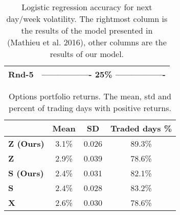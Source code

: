 \documentclass[10pt,twocolumn,letterpaper]{article}
\begin{document}
\begin{table}[t]
\begin{small}
\begin{tabular}{l@{~}l@{~}l@{~}l@{~}l@{~}l}
\textbf{Rnd-5}  & \multicolumn{5}{c}{---------------- 25\% ----------------}                                                                                                                                                             \\ \bottomrule
\end{tabular}
\end{small}
 \smallskip
\caption{Logistic regression accuracy for next day/week  volatility. The rightmost column is the results of the model presented in (Mathieu et al. 2016), other columns are the results of our model.}
\label{vol_exc}
\end{table}
\begin{table}
\centering
\begin{small}
\begin{tabular}{l@{~}c@{~}c@{~}c}
\toprule
           & \textbf{Mean} & \textbf{SD} & \textbf{Traded days \%} \\ \midrule
\textbf{Z (Ours)} & 3.1\%          & 0.026       & 89.3\%   \\
\textbf{Z~\cite{disentanglement}} & 2.9\%          & 0.039 & 78.6\%   \\
\textbf{S (Ours)} & 2.4\%          & 0.031       & 82.1\%   \\
\textbf{S~\cite{disentanglement}} & 2.4\%          & 0.028 & 83.2\%   \\
\textbf{X} & 2.6\%          & 0.030        & 78.6\%  \\ \bottomrule                            
\end{tabular}
\end{small}
\smallskip
\caption{Options portfolio returns. The mean, std and percent of trading days with positive returns.}
\label{Tbl_portfoliovol}
\vspace{-5mm}
 \end{table}
\end{document}
